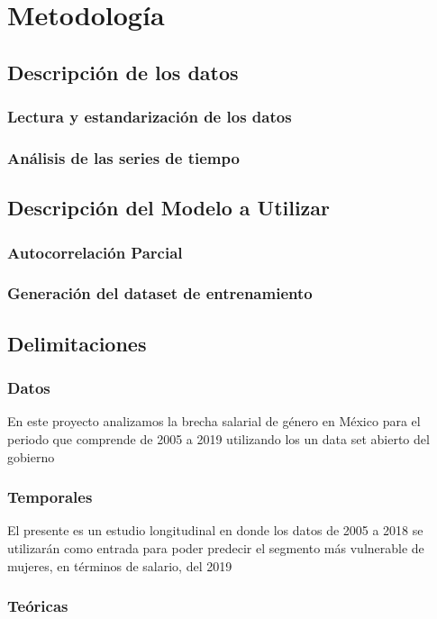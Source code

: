 \newpage
\section{Metodolog\'ia}

\subsection{Descripci\'on de los datos}
\subsubsection{Lectura y estandarizaci\'on de los datos}
\subsubsection{An\'alisis de las series de tiempo}


\subsection{Descripci\'on del Modelo a Utilizar}
\subsubsection{Autocorrelaci\'on Parcial}
\subsubsection{Generaci\'on del dataset de entrenamiento}

\subsection{Delimitaciones}
\subsubsection{Datos}
En este proyecto analizamos la brecha salarial de género en México para el periodo que comprende de 2005 a 2019 utilizando los un data set abierto del gobierno 
\subsubsection{Temporales}
El presente es un estudio longitudinal en donde los datos de 2005 a 2018 se utilizar\'an como entrada para poder predecir el segmento m\'as vulnerable de mujeres, en t\'erminos de salario, del 2019

\subsubsection{Te\'oricas}